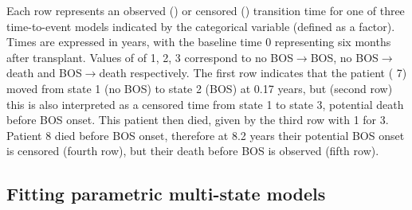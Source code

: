 \documentclass[nojss,nofooter]{jss}
\begin{document}
Each row represents an observed () or censored
() transition time for one of three time-to-event
models indicated by the categorical variable  (defined as
a factor).  Times are expressed in years, with the baseline time 0
representing six months after transplant.  Values of  of
1, 2, 3 correspond to no BOS$\rightarrow$BOS, no BOS$\rightarrow$death
and BOS$\rightarrow$death respectively.  The first row indicates that
the patient ( 7) moved from state 1 (no BOS) to state 2 (BOS)
at 0.17 years, but (second row) this is also interpreted as a
censored time from state 1 to state 3, potential death before BOS
onset.  This patient then died, given by the third row with
 1 for  3.  Patient 8 died before BOS onset,
therefore at 8.2 years their potential BOS onset is censored (fourth
row), but their death before BOS is observed (fifth row).

\subsection{Fitting parametric multi-state models}
\end{document}
